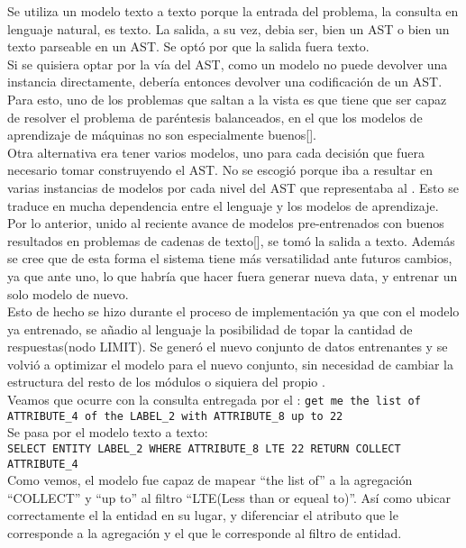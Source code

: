 Se utiliza un modelo texto a texto porque la entrada del problema, la consulta en lenguaje natural, es texto. La salida, a su vez, debia ser, bien un AST o bien un texto parseable en un AST. Se opt\'o por que la salida fuera texto.\\

Si se quisiera optar por la v\'ia del AST, como un modelo no puede devolver una instancia directamente, debería entonces devolver una codificación de un AST. Para esto, uno de los problemas que saltan a la vista es que tiene que ser capaz de resolver el problema de par\'entesis balanceados, en el que los modelos de aprendizaje de m\'aquinas no son especialmente buenos[].\\

Otra alternativa era tener varios modelos, uno para cada decisi\'on que fuera necesario tomar construyendo el AST. No se escogi\'o porque iba a resultar en varias instancias de modelos por cada nivel del AST que representaba al . Esto se traduce en mucha dependencia entre el lenguaje y los modelos de aprendizaje.\\

Por lo anterior, unido al reciente avance de modelos pre-entrenados con buenos resultados en problemas de cadenas de texto[], se tom\'o la salida a texto. Además se cree que de esta forma el sistema tiene m\'as versatilidad ante futuros cambios, ya que ante uno, lo que habr\'ia que hacer fuera generar nueva data, y entrenar un solo modelo de nuevo.\\

Esto de hecho se hizo durante el proceso de implementaci\'on ya que con el modelo ya entrenado, se añadio al lenguaje la posibilidad de topar la cantidad de respuestas(nodo LIMIT). Se gener\'o el nuevo conjunto de datos entrenantes y se volvi\'o a optimizar el modelo para el nuevo conjunto, sin necesidad de cambiar la estructura del resto de los m\'odulos o siquiera del propio .\\

Veamos que ocurre con la consulta entregada por el :
\verb|get me the list of ATTRIBUTE_4 of the LABEL_2 with ATTRIBUTE_8 up to 22|\\

Se pasa por el modelo texto a texto:\\
\verb|SELECT ENTITY LABEL_2 WHERE ATTRIBUTE_8 LTE 22 RETURN COLLECT ATTRIBUTE_4|\\

Como vemos, el modelo fue capaz de mapear ``the list of'' a la agregaci\'on ``COLLECT'' y ``up to'' al filtro ``LTE(Less than or equeal to)''. As\'i como ubicar correctamente el la entidad en su lugar, y diferenciar el atributo que le corresponde a la agregaci\'on y el que le corresponde al filtro de entidad.

